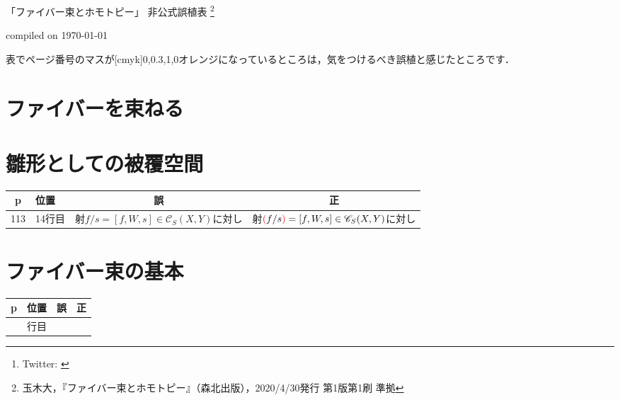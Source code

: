 \documentclass[a4j,11pt,dvipdfmx]{jsarticle}
\title{}
\author{@%
	\thanks{Twitter: \url{} }}
\date{}
\theoremstyle{definition}
\newcommand{\red}[1]{\textcolor{red}{#1}}
\begin{document}

\begin{center}
  \Large{「ファイバー束とホモトピー」 非公式誤植表} 
  \footnote{玉木大，『ファイバー束とホモトピー』（森北出版），2020/4/30発行 第1版第1刷 準拠}

 \large{compiled on \today}
 \vspace{5mm}
\end{center}



表でページ番号のマスが[cmyk]{0,0.3,1,0}{オレンジ}になっているところは，気をつけるべき誤植と感じたところです．




\section{ファイバーを束ねる}


\section{雛形としての被覆空間}



{\centering
\begin{tabular}{|c|l|c|c|} \hline
 \rowcolor[gray]{0.8} 
 p & 位置 & 誤 & 正 \\ \hline
 113 & 14行目 & 射$f/s = [f,W,s] \in \mathscr{C}_S(X,Y)$に対し & 射$\red{(}f/s\red{)} = [f,W,s] \in \mathscr{C}_S(X,Y)$に対し \\ \hline
\end{tabular}}





\section{ファイバー束の基本}

{\centering
\begin{tabular}{|c|l|c|c|} \hline
	\rowcolor[gray]{0.8} 
	p & 位置 & 誤 & 正 \\ \hline
	
	 & 行目 &  &  \\ \hline
\end{tabular}}
\end{document}

